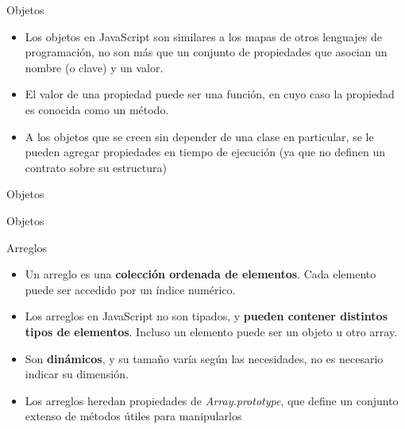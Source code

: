 \documentclass[aspectratio=43,10pt,t]{beamer}
\begin{document}
\begin{frame}{Objetos}\relax
\begingroup
{}
\begin{itemize}
  \item Los objetos en JavaScript son similares a los mapas de otros lenguajes de programación, no son más que un conjunto de propiedades que asocian un nombre (o clave) y un valor.
  \item El valor de una propiedad puede ser una función, en cuyo caso la propiedad es conocida como un método.
  \item A los objetos que se creen sin depender de una clase en particular, se le pueden agregar propiedades en tiempo de ejecución (ya que no definen un contrato sobre su estructura)
\end{itemize}
\endgroup
\end{frame}

\begin{frame}{Objetos}\relax
{}
\end{frame}

\begin{frame}{Objetos}\relax
{}
\end{frame}

\begin{frame}{Arreglos}\relax
\begingroup
{}
\begin{itemize}
  \item Un arreglo es una \textbf{colección ordenada de elementos}. Cada elemento puede ser accedido por un índice numérico.
  \item Los arreglos en JavaScript no son tipados, y \textbf{pueden contener distintos tipos de elementos}. Incluso un elemento puede ser un objeto u otro array.
  \item Son \textbf{dinámicos}, y su tamaño varía según las necesidades, no es necesario indicar su dimensión.
  \item Los arreglos heredan propiedades de \textit{Array.prototype}, que define un conjunto extenso de métodos útiles para manipularlos
\end{itemize}
\endgroup
\end{frame}
\end{document}
